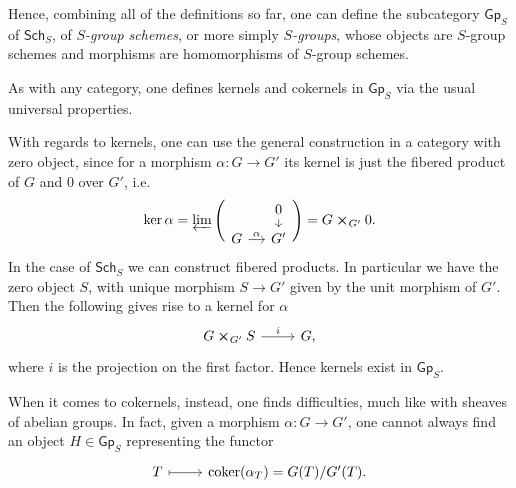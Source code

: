 \documentclass[../Main]{subfiles}
\begin{document}
\begin{defn}
	Hence, combining all of the definitions so far, 
	one can define the subcategory $\mathsf{Gp}_S$ of $\mathsf{Sch}_{ S }$,
	of {\em $S$-group schemes}, or more simply {\em $S$-groups},
	whose objects are $S$-group schemes
	and morphisms are homomorphisms of $S$-group schemes.
\end{defn}


\begin{rem}
	As with any category, one defines kernels and cokernels 
	in $\mathsf{Gp}_S$ via the usual universal properties.

	With regards to kernels, one can use the general construction 
	in a category with zero object,
	since for a morphism $\alpha\colon G \to G'$ its kernel
	is just the fibered product of $G$ and $0$ over $G'$, i.e.
	\begin{equation*}
		\ker \alpha =
		\varprojlim \Bigg(
			\begin{tikzcd}[row sep=0.60em, column sep=1.2em]
			&
			0 \arrow[d, "", rightarrow] \\
			G \arrow[r, "\alpha", rightarrow] &
			G'
		\end{tikzcd} \Bigg)
		= G \cross_{G'} 0
	.\end{equation*}
	In the case of $\mathsf{Sch}_{ S }$ we can construct fibered products.
	In particular we have the zero object $S$, with unique morphism
	$S \to G'$ given by the unit morphism of $G'$.
	Then the following gives rise to a kernel for $\alpha$
	\begin{equation*}
	\begin{tikzcd}
		G \cross_{ G' } S \arrow[r, "i", rightarrow] &
		G,
	\end{tikzcd}
	\end{equation*} 
	where $i$ is the projection on the first factor.
	Hence kernels exist in $\mathsf{Gp}_S$.
	
	When it comes to cokernels, instead, one finds difficulties, much like
	with sheaves of abelian groups.
	In fact, given a morphism $\alpha\colon G \to G'$, one cannot always find an
	object $H \in \mathsf{Gp}_S$ representing the functor
	\begin{equation*}
	\begin{tikzcd}
		T \arrow[r, "", mapsto] &
		\coker (\alpha_T) =
		G(T)/G'(T).
	\end{tikzcd}
	\end{equation*}
\end{rem}
\end{document}
